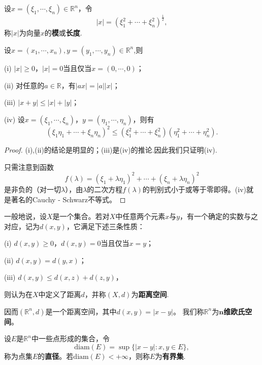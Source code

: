 \documentclass[lang=cn,newtx,10pt,scheme=chinese]{../Template/elegantbook}
\begin{document}
\begin{definition}
设\(x = (\xi_1,\cdots,\xi_n)\in\mathbb{R}^n\)，令
\[|x| = (\xi_1^2+\cdots+\xi_n^2)^{\frac{1}{2}},\]
称\(|x|\)为向量\(x\)的\textbf{模}或\textbf{长度}.
\end{definition}

\begin{proposition}[向量的模的性质]\label{proposition:向量的模的性质}
设\(x=(x_1,\cdots ,x_n),y=\left( y_1,\cdots ,y_n \right) \in \mathbb{R} ^n\),则

(i) \(|x|\geqslant0\)，\(|x| = 0\)当且仅当\(x=(0,\cdots,0)\)；

(ii) 对任意的\(a\in\mathbb{R}\)，有\(|ax| = |a||x|\)；

(iii) \(|x + y|\leqslant|x|+|y|\)；

(iv) 设\(x = (\xi_1,\cdots,\xi_n)\)，\(y = (\eta_1,\cdots,\eta_n)\)，则有
\[(\xi_1\eta_1+\cdots+\xi_n\eta_n)^2\leqslant(\xi_1^2+\cdots+\xi_n^2)(\eta_1^2+\cdots+\eta_n^2).\]
\end{proposition}
\begin{proof}
  (i),(ii)的结论是明显的；(iii)是(iv)的推论.因此我们只证明(iv).

只需注意到函数
\[f(\lambda)=(\xi_1+\lambda\eta_1)^2+\cdots+(\xi_n+\lambda\eta_n)^2\]
是非负的（对一切\(\lambda\)），由\(\lambda\)的二次方程\(f(\lambda)\)的判别式小于或等于零即得。(iv)就是著名的Cauchy - Schwarz不等式。
\end{proof}

\begin{definition}[距离空间]\label{definition:距离空间}
  一般地说，设\(X\)是一个集合。若对\(X\)中任意两个元素\(x\)与\(y\)，有一个确定的实数与之对应，记为\(d(x,y)\)，它满足下述三条性质：

(i) \(d(x,y)\geqslant0\)，\(d(x,y)=0\)当且仅当\(x = y\)；

(ii) \(d(x,y)=d(y,x)\)；

(iii) \(d(x,y)\leqslant d(x,z)+d(z,y)\)，

则认为在\(X\)中定义了距离\(d\)，并称\((X,d)\)为\textbf{距离空间}.
\end{definition}
\begin{note}
  因而\((\mathbb{R}^n,d)\)是一个距离空间，其中\(d(x,y)=|x - y|\)。
我们称\(\mathbb{R}^n\)为\textbf{\(\boldsymbol{n}\)维欧氏空间}。
\end{note}

\begin{definition}[点集的直径与有界集]\label{definition:点集的直径与有界集}
设\(E\)是\(\mathbb{R}^n\)中一些点形成的集合，令
\[\text{diam}(E)=\sup\{|x - y|:x,y\in E\},\]
称为点集\(E\)的\textbf{直径}。若\(\text{diam}(E)<+\infty\)，则称\(E\)为\textbf{有界集}.
\end{definition}
\end{document}
